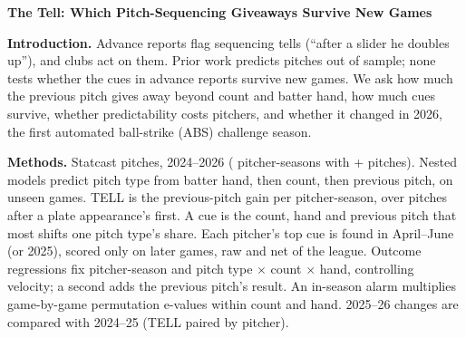 \documentclass[11pt]{article}
\begin{document}
{\large\bfseries The Tell: Which Pitch-Sequencing Giveaways Survive New Games}

\textbf{Introduction.} Advance reports flag sequencing tells (``after a slider he doubles up''), and
clubs act on them. Prior work predicts pitches out of sample; none tests whether the cues in advance reports survive new games. We ask how much the previous pitch gives away beyond count and
batter hand, how much cues survive, whether predictability costs
pitchers, and whether it changed in 2026, the first automated ball-strike (ABS) challenge season.

\textbf{Methods.} \nPitches{} Statcast pitches, 2024--2026 (\nPS{} pitcher-seasons
with \minN+ pitches). Nested models predict pitch type from batter hand, then count, then
previous pitch, on unseen games. TELL is the previous-pitch gain per pitcher-season, over
pitches after a plate appearance's first. A cue is the count, hand and previous pitch that most
shifts one pitch type's share. Each pitcher's top cue is found in April--June (or 2025), scored only on later games, raw and net of the league. Outcome regressions fix pitcher-season and pitch type $\times$ count $\times$ hand, controlling velocity; a second adds the previous pitch's result. An in-season alarm multiplies game-by-game
permutation e-values within count and hand. 2025--26 changes are compared with 2024--25 (TELL paired by pitcher).
\end{document}
